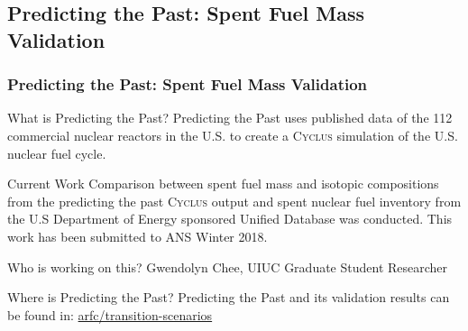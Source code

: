 \newcommand{\Cyclus}{\textsc{Cyclus}\xspace}%
\subsection{Predicting the Past: Spent Fuel Mass Validation}
\begin{frame}
  \frametitle{Predicting the Past: Spent Fuel Mass Validation}

\begin{block}{What is Predicting the Past? }
Predicting the Past uses published data of the 112 commercial nuclear reactors in the U.S. to create a \Cyclus simulation of the U.S. nuclear fuel cycle.
\end{block}

\begin{block}{Current Work}
Comparison between spent fuel mass and isotopic compositions from the predicting the past \Cyclus output and spent nuclear fuel inventory from the U.S Department of Energy sponsored Unified Database\cite{peterson_unf-st&dards_2017} was conducted. This work has been submitted to ANS Winter 2018.
\end{block}

\begin{block}{Who is working on this?}
Gwendolyn Chee, UIUC Graduate Student Researcher
\end{block}

\begin{block}{Where is Predicting the Past?}
Predicting the Past and its validation results can be found in: \href{https://github.com/arfc/transition-scenarios/tree/master/input/predicting-the-past}{arfc/transition-scenarios} 
\end{block}

\end{frame}
